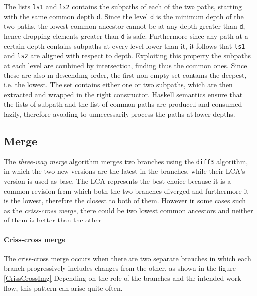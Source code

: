 \documentclass[../Thesis.tex]{subfiles}
\begin{document}
	The lists \texttt{ls1} and \texttt{ls2} contains the subpaths of each
	of the two paths, starting with the same common depth \texttt{d}.
	Since the level \texttt{d} is the minimum depth of the two paths, the
	lowest common ancestor cannot be at any depth greater than \texttt{d},
	hence dropping elements greater than \texttt{d} is safe. Furthermore
	since any path at a certain depth contains subpaths at every level
	lower than it, it follows that \texttt{ls1} and \texttt{ls2} are aligned
	with respect to depth.
	Exploiting this property the subpaths at each level are combined by
	intersection, finding thus the common ones.
	Since these are also in descending order, 
	the first non empty set contains the deepest, i.e. the lowest.
	The set contains either one or two subpaths, which are then extracted
	and wrapped in the right constructor.
	Haskell semantics ensure that the lists of subpath and the list
	of common paths are produced and consumed lazily, therefore
	avoiding to unnecessarily process the paths at lower depths.
	
	\subsection{Merge}
	\label{subsec:MergeLCA}
	The \emph{three-way merge} algorithm merges two branches using the 
	\texttt{diff3} algorithm, in which the two new versions are the 
	latest in the branches, while their LCA's version is used as 
	base. The LCA represents the best choice because
	it is a common revision from which both the two branches diverged and
	furthermore it is the lowest, therefore the closest to both of them.
	However in some cases such as the \emph{criss-cross merge}, 
	there could be two lowest common ancestors and neither of them
	is better than the other.
	
	\paragraph{Criss-cross merge}
	The criss-cross merge occurs when there are two separate branches
	in which each branch progressively includes changes from the other,
	as shown in the figure \ref{CrissCrossImg}
	Depending on the role of the branches and the intended work-flow,
	this pattern can arise quite often.
	
\end{document}
